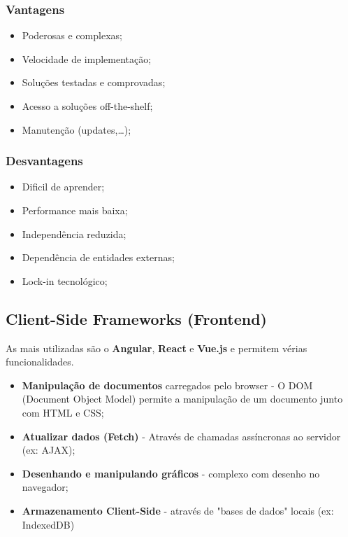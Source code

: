 \documentclass{article}
\begin{document}
\subsubsection{Vantagens}

\begin{itemize}
  \item Poderosas e complexas;
  \item Velocidade de implementação;
  \item Soluções testadas e comprovadas;
  \item Acesso a soluções off-the-shelf;
  \item Manutenção (updates,\dots);
\end{itemize}

\subsubsection{Desvantagens}

\begin{itemize}
  \item Dificil de aprender;
  \item Performance mais baixa;
  \item Independência reduzida;
  \item Dependência de entidades externas;
  \item Lock-in tecnológico;
\end{itemize}

\pagebreak

\subsection{Client-Side Frameworks (Frontend)}

As mais utilizadas são o \textbf{Angular}, \textbf{React} e \textbf{Vue.js} e permitem vérias funcionalidades.
\begin{itemize}
  \item \textbf{Manipulação de documentos} carregados pelo browser -
  O DOM (Document Object Model) permite a manipulação de um documento junto com HTML e CSS;

  \item \textbf{Atualizar dados (Fetch)} - Através de chamadas assíncronas ao
  servidor (ex: AJAX);

  \item \textbf{Desenhando e manipulando gráficos} - complexo com desenho no navegador;
  \item \textbf{Armazenamento Client-Side} - através de "bases de dados" locais
  (ex: IndexedDB)
\end{itemize}
\end{document}
